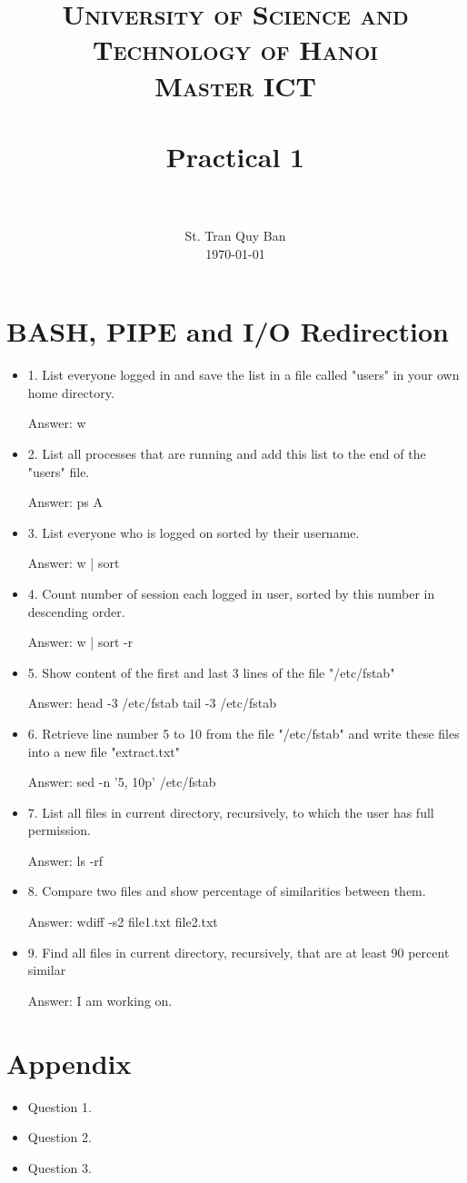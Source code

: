 \documentclass[paper=a4, fontsize=11pt]{scrartcl}
\title{
		\usefont{OT1}{bch}{b}{n}
		\normalfont \normalsize \textsc{University of Science and Technology of Hanoi \\ Master ICT} \\ [25pt]
		\horrule{0.5pt} \\[0.4cm]
		\huge Practical 1 \\
		\horrule{2pt} \\[0.5cm]
}
\author{
		\normalfont 								\normalsize
        St. Tran Quy Ban\\[-3pt]		\normalsize
        \today
}
\date{}
\numberwithin{equation}{section}		%
\numberwithin{figure}{section}			%
\numberwithin{table}{section}				%
\begin{document}
\maketitle

\section{BASH, PIPE and I/O Redirection}

\begin{itemize}
	\item 1. List everyone logged in and save the list in a file called "users" in your own home directory.
	
	Answer: w
	\item 2. List all processes that are running and add this list to the end of the "users" file.
	
	Answer: ps A
	\item 3. List everyone who is logged on sorted by their username.
	
	Answer: w | sort
	\item 4. Count number of session each logged in user, sorted by this number in descending order.
	
	Answer: w | sort -r
	\item 5. Show content of the first and last 3 lines of the file "/etc/fstab"
	
	Answer:  
	head -3 /etc/fstab
	tail -3 /etc/fstab
	
	\item 6. Retrieve line number 5 to 10 from the file "/etc/fstab" and write these files into a new file "extract.txt"
	
	Answer: sed -n '5, 10p' /etc/fstab
	\item 7. List all files in current directory, recursively, to which the user has full permission.
	
	Answer: ls -rf
	\item 8. Compare two files and show percentage of similarities between them.
	
	Answer: wdiff -s2 file1.txt file2.txt
	\item 9. Find all files in current directory, recursively, that are at least 90 percent similar
	
	Answer:  I am working on.
\end{itemize}

\section{Appendix}

\begin{itemize}
	\item Question 1.
	
	
	\item Question 2.
	
	
	\item Question 3.
\end{itemize}

\end{document}
